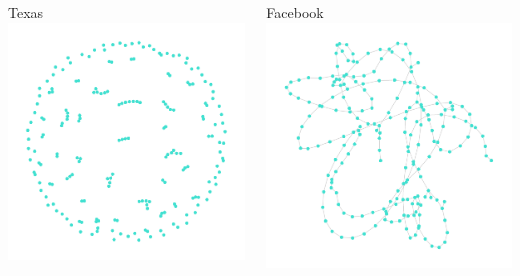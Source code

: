 \documentclass{beamer}
\begin{document}
\begin{frame}
\begin{columns}
\begin{column}[t]{0.5\textwidth}
\begin{block}{Texas}
        \includegraphics[scale=0.3]{fig/texas_ff}
      \end{block}
    \end{column}
    \begin{column}[t]{0.5\textwidth}
      \begin{block}{Facebook}
        \centering
        \includegraphics[scale=0.3]{fig/facebook_rw}\\

\end{block}
\end{column}
\end{columns}
\end{frame}
\end{document}
